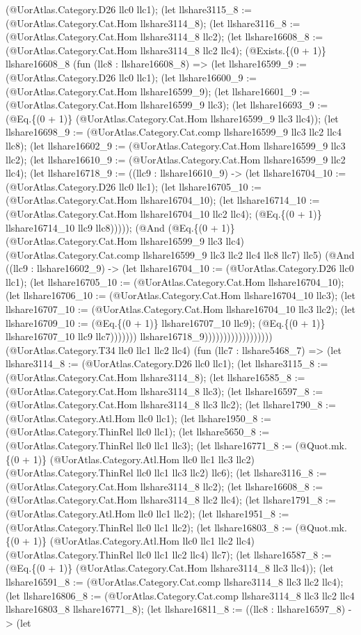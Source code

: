 \documentclass[11pt]{article}
\begin{document}
(@UorAtlas.Category.D26 llc0 llc1); (let llshare3115\_8 := (@UorAtlas.Category.Cat.Hom llshare3114\_8); (let llshare3116\_8 := (@UorAtlas.Category.Cat.Hom llshare3114\_8 llc2); (let llshare16608\_8 := (@UorAtlas.Category.Cat.Hom llshare3114\_8 llc2 llc4); (@Exists.\{(0 + 1)\} llshare16608\_8 (fun (llc8 : llshare16608\_8) => (let llshare16599\_9 := (@UorAtlas.Category.D26 llc0 llc1); (let llshare16600\_9 := (@UorAtlas.Category.Cat.Hom llshare16599\_9); (let llshare16601\_9 := (@UorAtlas.Category.Cat.Hom llshare16599\_9 llc3); (let llshare16693\_9 := (@Eq.\{(0 + 1)\} (@UorAtlas.Category.Cat.Hom llshare16599\_9 llc3 llc4)); (let llshare16698\_9 := (@UorAtlas.Category.Cat.comp llshare16599\_9 llc3 llc2 llc4 llc8); (let llshare16602\_9 := (@UorAtlas.Category.Cat.Hom llshare16599\_9 llc3 llc2); (let llshare16610\_9 := (@UorAtlas.Category.Cat.Hom llshare16599\_9 llc2 llc4); (let llshare16718\_9 := ((llc9 : llshare16610\_9) -> (let llshare16704\_10 := (@UorAtlas.Category.D26 llc0 llc1); (let llshare16705\_10 := (@UorAtlas.Category.Cat.Hom llshare16704\_10); (let llshare16714\_10 := (@UorAtlas.Category.Cat.Hom llshare16704\_10 llc2 llc4); (@Eq.\{(0 + 1)\} llshare16714\_10 llc9 llc8))))); (@And (@Eq.\{(0 + 1)\} (@UorAtlas.Category.Cat.Hom llshare16599\_9 llc3 llc4) (@UorAtlas.Category.Cat.comp llshare16599\_9 llc3 llc2 llc4 llc8 llc7) llc5) (@And ((llc9 : llshare16602\_9) -> (let llshare16704\_10 := (@UorAtlas.Category.D26 llc0 llc1); (let llshare16705\_10 := (@UorAtlas.Category.Cat.Hom llshare16704\_10); (let llshare16706\_10 := (@UorAtlas.Category.Cat.Hom llshare16704\_10 llc3); (let llshare16707\_10 := (@UorAtlas.Category.Cat.Hom llshare16704\_10 llc3 llc2); (let llshare16709\_10 := (@Eq.\{(0 + 1)\} llshare16707\_10 llc9); (@Eq.\{(0 + 1)\} llshare16707\_10 llc9 llc7))))))) llshare16718\_9)))))))))))))))))) (@UorAtlas.Category.T34 llc0 llc1 llc2 llc4) (fun (llc7 : llshare5468\_7) => (let llshare3114\_8 := (@UorAtlas.Category.D26 llc0 llc1); (let llshare3115\_8 := (@UorAtlas.Category.Cat.Hom llshare3114\_8); (let llshare16585\_8 := (@UorAtlas.Category.Cat.Hom llshare3114\_8 llc3); (let llshare16597\_8 := (@UorAtlas.Category.Cat.Hom llshare3114\_8 llc3 llc2); (let llshare1790\_8 := (@UorAtlas.Category.Atl.Hom llc0 llc1); (let llshare1950\_8 := (@UorAtlas.Category.ThinRel llc0 llc1); (let llshare5650\_8 := (@UorAtlas.Category.ThinRel llc0 llc1 llc3); (let llshare16771\_8 := (@Quot.mk.\{(0 + 1)\} (@UorAtlas.Category.Atl.Hom llc0 llc1 llc3 llc2) (@UorAtlas.Category.ThinRel llc0 llc1 llc3 llc2) llc6); (let llshare3116\_8 := (@UorAtlas.Category.Cat.Hom llshare3114\_8 llc2); (let llshare16608\_8 := (@UorAtlas.Category.Cat.Hom llshare3114\_8 llc2 llc4); (let llshare1791\_8 := (@UorAtlas.Category.Atl.Hom llc0 llc1 llc2); (let llshare1951\_8 := (@UorAtlas.Category.ThinRel llc0 llc1 llc2); (let llshare16803\_8 := (@Quot.mk.\{(0 + 1)\} (@UorAtlas.Category.Atl.Hom llc0 llc1 llc2 llc4) (@UorAtlas.Category.ThinRel llc0 llc1 llc2 llc4) llc7); (let llshare16587\_8 := (@Eq.\{(0 + 1)\} (@UorAtlas.Category.Cat.Hom llshare3114\_8 llc3 llc4)); (let llshare16591\_8 := (@UorAtlas.Category.Cat.comp llshare3114\_8 llc3 llc2 llc4); (let llshare16806\_8 := (@UorAtlas.Category.Cat.comp llshare3114\_8 llc3 llc2 llc4 llshare16803\_8 llshare16771\_8); (let llshare16811\_8 := ((llc8 : llshare16597\_8) -> (let 
\end{document}
